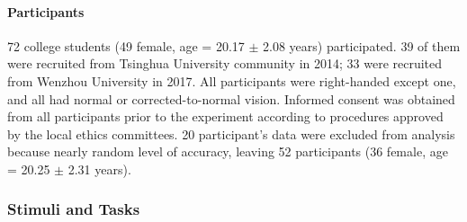 \documentclass[
  english,
  man]{apa6}
\let\oldparagraph\paragraph
\renewcommand{\paragraph}[1]{\oldparagraph{#1}\mbox{}}
\begin{document}
\hypertarget{participants-1}{%
\paragraph{Participants}\label{participants-1}}

72 college students (49 female, age = 20.17 \(\pm\) 2.08 years) participated. 39 of them were recruited from Tsinghua University community in 2014; 33 were recruited from Wenzhou University in 2017. All participants were right-handed except one, and all had normal or corrected-to-normal vision. Informed consent was obtained from all participants prior to the experiment according to procedures approved by the local ethics committees. 20 participant's data were excluded from analysis because nearly random level of accuracy, leaving 52 participants (36 female, age = 20.25 \(\pm\) 2.31 years).

\hypertarget{stimuli-and-tasks-1}{%
\subsubsection{Stimuli and Tasks}\label{stimuli-and-tasks-1}}
\end{document}
